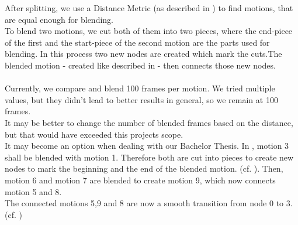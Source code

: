 \documentclass[a4paper,10pt,titlepage,bibliography=totocnumbered]{scrartcl}
\begin{document}
After splitting, we use a Distance Metric (as described in ) to find motions, that are equal enough for blending.
\\
To blend two motions, we cut both of them into two pieces, where the end-piece of the first and the start-piece of the second motion are the parts used for blending. In this process two new nodes are created which mark the cuts.The blended motion - created like described in  - then connects those new nodes.
\\\\
Currently, we compare and blend 100 frames per motion. We tried multiple values, but they didn't lead to better results in general, so we remain at 100 frames.
\\
It may be better to change the number of blended frames based on the distance, but that would have exceeded this projects scope.\\
It may become an option when dealing with our Bachelor Thesis. 
\newpage In , motion 3 shall be blended with motion 1. Therefore both are cut into pieces to create new nodes to mark the beginning and the end of the blended motion. (cf. ). Then, motion 6 and motion 7 are blended to create motion 9, which now connects motion 5 and 8.
\\
The connected motions 5,9 and 8 are now a smooth transition from node 0 to 3. (cf. )
\end{document}
